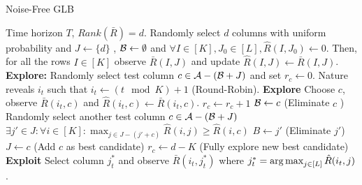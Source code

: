 \begin{algorithm}[!th]
\caption{Noise-Free GLB}
\label{alg:NFGLB}
\begin{algorithmic}
 Time horizon $T$, $Rank(\bar{R}) = d$.
 Randomly select $d$ columns with uniform probability and $J\leftarrow \lbrace d \rbrace$ , $\mathcal{B} \leftarrow \emptyset$ and $\forall I\in [K], J_0\in [L], \hat{R}(I,J_0) \leftarrow 0$.
\State Then, for all the rows $I\in[K]$ observe $\bar{R}(I,J)$ and update  $\hat{R}(I,J) \leftarrow \bar{R}(I,J)$.
\State \textbf{Explore: } Randomly select test column $c \in \mathcal{A} - (\mathcal{B} + J)$ and set $r_c \leftarrow 0$.
\State Nature reveals $i_t$ such that $i_t \leftarrow (t \mod K) + 1$ (Round-Robin).
 \textbf{Explore}
\State Choose $c$, observe $\bar{R}(i_t,c)$ and $\hat{R}(i_t,c)\leftarrow \bar{R}(i_t,c)$.
\State $r_c \leftarrow r_c + 1$
\ColElim
\State {} 
\State  $\mathcal{B} \leftarrow c$ (Eliminate $c$ )
\State Randomly select another test column $c \in \mathcal{A} - (\mathcal{B} + J)$
\Else
\State $\exists j'\in J: \forall i\in [K]: \max_{j\in J - (j' + c)} \hat{R}(i,j) \geq \hat{R}(i,c)$
\State $B \leftarrow j' $ (Eliminate $j'$)
\State $J\leftarrow c$ (Add $c$ as best candidate)
\State $r_c \leftarrow d - K $ (Fully explore new best candidate)
\EndIf
\EndColElim
{} \textbf{Exploit}
\State  Select column $j_t^*$ and observe $\bar{R}(i_t,j_t^*)$ where $j_t^* = \mathop{\rm arg\,max}_{j\in[L]} {\hat{R}(i_t,j)}$.
\EndIf
\EndFor
\end{algorithmic}
\end{algorithm}


